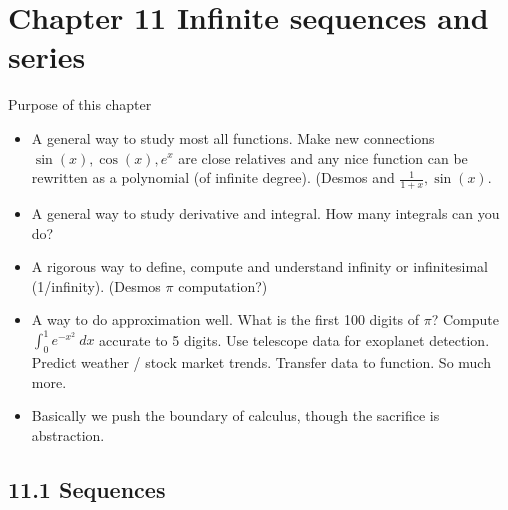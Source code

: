 \documentclass{article}
\begin{document}
\section{Chapter 11 Infinite sequences and series}
Purpose of this chapter
\begin{itemize}
\item A general way to study most all functions. Make new connections $\sin(x),\cos(x), e^x$ are close relatives and any nice function can be rewritten as a polynomial (of infinite degree). (Desmos and $\frac{1}{1+x}, \sin(x)$.
\item A general way to study derivative and integral. How many integrals can you do? 
\item A rigorous way to define, compute and understand infinity or infinitesimal (1/infinity). (Desmos $\pi$ computation?)
\item A way to do approximation well. What is the first 100 digits of $\pi$? Compute $\int_0^1 e^{-x^2}~dx$ accurate to 5 digits. Use telescope data for exoplanet detection. Predict weather / stock market trends. Transfer data to function. So much more. 
\item Basically we push the boundary of calculus, though the sacrifice is abstraction.
\end{itemize}


\subsection{11.1 Sequences}
\end{document}
